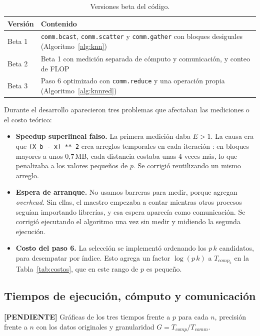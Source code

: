 \documentclass[11pt,a4paper]{article}
\newcommand{\tcomp}[1]{T_{comp_{#1}}}
\newcommand{\pendiente}[1]{\textcolor{red!75!black}{\textbf{[PENDIENTE]} #1}}
\begin{document}
\begin{table}[ht]
\centering\small
\begin{tabularx}{\linewidth}{lX}
  \toprule
  \textbf{Versión} & \textbf{Contenido} \\
  \midrule
  Beta 1 & \texttt{comm.bcast}, \texttt{comm.scatter} y \texttt{comm.gather} con bloques desiguales (Algoritmo~\ref{alg:knn}) \\
  Beta 2 & Beta 1 con medición separada de cómputo y comunicación, y conteo de FLOP \\
  Beta 3 & Paso 6 optimizado con \texttt{comm.reduce} y una operación propia (Algoritmo~\ref{alg:knnred}) \\
  \bottomrule
\end{tabularx}
\caption{Versiones beta del código.}
\label{tab:betas}
\end{table}

Durante el desarrollo aparecieron tres problemas que afectaban las mediciones o el costo teórico:
\begin{itemize}
  \item \textbf{Speedup superlineal falso.} La primera medición daba $E>1$. La causa era que \texttt{(X\_b - x) ** 2} crea arreglos temporales en cada iteración \cite{numpy}: en bloques mayores a unos 0,7\,MB, cada distancia costaba unas 4 veces más, lo que penalizaba a los valores pequeños de $p$. Se corrigió reutilizando un mismo arreglo.
  \item \textbf{Espera de arranque.} No usamos barreras para medir, porque agregan \textit{overhead}. Sin ellas, el maestro empezaba a contar mientras otros procesos seguían importando librerías, y esa espera aparecía como comunicación. Se corrigió ejecutando el algoritmo una vez sin medir y midiendo la segunda ejecución.
  \item \textbf{Costo del paso 6.} La selección se implementó ordenando los $p\,k$ candidatos, para desempatar por índice. Esto agrega un factor $\log(p\,k)$ a $\tcomp{2}$ en la Tabla~\ref{tab:costos}, que en este rango de $p$ es pequeño.
\end{itemize}

\subsection{Tiempos de ejecución, cómputo y comunicación}
\pendiente{Gráficas de los tres tiempos frente a $p$ para cada $n$, precisión frente a $n$ con los datos originales y granularidad $G=T_{comp}/T_{comm}$.}
\end{document}
